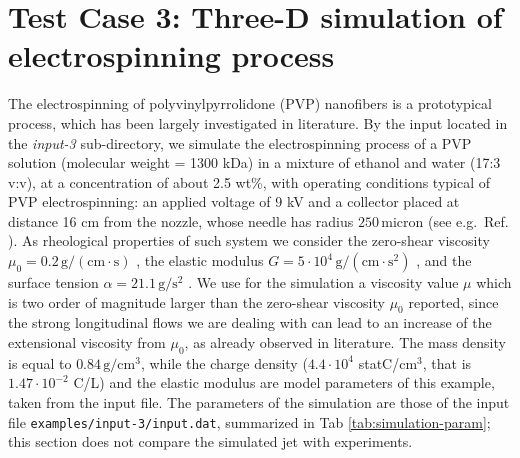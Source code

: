 \section{Test Case 3: Three-D simulation of electrospinning process\label{sec:Test-Case-3:}}

The electrospinning of polyvinylpyrrolidone (PVP) nanofibers is a
prototypical process, which has been largely investigated in literature.\cite{yarin2014fundamentals,pisignanoelectrospinning,persano2013industrial}
By the input located in the \textit{input-3} sub-directory, we simulate
the electrospinning process of a PVP solution (molecular weight = 1300 kDa)
in a mixture of ethanol and water (17:3 v:v), at a concentration of about
2.5 wt\%, with operating conditions typical of PVP electrospinning: an
applied voltage of 9 kV and a collector placed at distance 16 cm from the
nozzle, whose needle has radius $250\,$micron (see e.g.\ Ref.
\cite{montinaro2015electrospinning}). As rheological properties of such system we consider the zero-shear
viscosity $\mu_{0}=0.2\,\text{g}/(\text{cm}\cdot\text{s})$ \cite{yuya2010morphology,buhler2005polyvinylpyrrolidone},
the elastic modulus $G=5\cdot10^{4}\,\text{g}/(\text{cm}\cdot\text{s}^{2})$
\cite{morozov2012water}, and the surface tension $\alpha=21.1\,\text{g}/\text{s}^{2}$
\cite{yuya2010morphology}. We use for the simulation a viscosity
value $\mu$ which is two order of magnitude larger than the zero-shear
viscosity $\mu_{0}$ reported, since the strong longitudinal flows
we are dealing with can lead to an increase of the extensional viscosity
from $\mu_{0}$, as already observed in literature.\cite{reneker2000bending,yarin1993free}
The mass density is equal to $0.84\,\text{g}/\text{cm}^{3}$, while
the charge density ($4.4\cdot10^{4}$ statC/cm$^{3}$, that is
$1.47\cdot10^{-2}$ C/L) and the elastic modulus are model parameters of
this example, taken from the input file. The parameters of the simulation are those
of the input file \texttt{examples/input-3/input.dat}, summarized in Tab
\ref{tab:simulation-param}; this section does not compare the simulated
jet with experiments.

